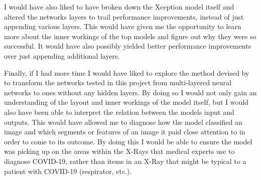 I would have also liked to have broken down the Xception model itself and altered the networks layers to trail performance improvements, instead of just appending various layers. This would have given me the opportunity to learn more about the inner workings of the top models and figure out why they were so successful. It would have also possibly yielded better performance improvements over just appending additional layers.

Finally, if I had more time I would have liked to explore the method devised by \cite{kamimura2019neural} to transform the networks tested in this project from multi-layered neural networks to ones without any hidden layers. By doing so I would not only gain an understanding of the layout and inner workings of the model itself, but I would also have been able to interpret the relation between the models input and outputs. This would have allowed me to diagnose how the model classified an image and which segments or features of an image it paid close attention to in order to come to its outcome. By doing this I would be able to ensure the model was picking up on the areas within the X-Rays that medical experts use to diagnose COVID-19, rather than items in an X-Ray that might be typical to a patient with COVID-19 (respirator, etc.).